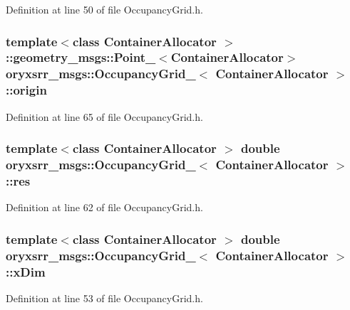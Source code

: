 \-Definition at line 50 of file \-Occupancy\-Grid.\-h.

\subsubsection[{origin}]{\setlength{\rightskip}{0pt plus 5cm}template$<$class Container\-Allocator $>$ \-::geometry\-\_\-msgs\-::\-Point\-\_\-$<$\-Container\-Allocator$>$ {\bf oryxsrr\-\_\-msgs\-::\-Occupancy\-Grid\-\_\-}$<$ \-Container\-Allocator $>$\-::{\bf origin}}\label{structoryxsrr__msgs_1_1OccupancyGrid___aad0989aee278548c876186dbd1f208b1}


\-Definition at line 65 of file \-Occupancy\-Grid.\-h.

\subsubsection[{res}]{\setlength{\rightskip}{0pt plus 5cm}template$<$class Container\-Allocator $>$ double {\bf oryxsrr\-\_\-msgs\-::\-Occupancy\-Grid\-\_\-}$<$ \-Container\-Allocator $>$\-::{\bf res}}\label{structoryxsrr__msgs_1_1OccupancyGrid___aaeb6c64a399d11052eeaec8a66fb34ac}


\-Definition at line 62 of file \-Occupancy\-Grid.\-h.

\subsubsection[{x\-Dim}]{\setlength{\rightskip}{0pt plus 5cm}template$<$class Container\-Allocator $>$ double {\bf oryxsrr\-\_\-msgs\-::\-Occupancy\-Grid\-\_\-}$<$ \-Container\-Allocator $>$\-::{\bf x\-Dim}}\label{structoryxsrr__msgs_1_1OccupancyGrid___adff56453b297aa817949963d3589b536}


\-Definition at line 53 of file \-Occupancy\-Grid.\-h.

